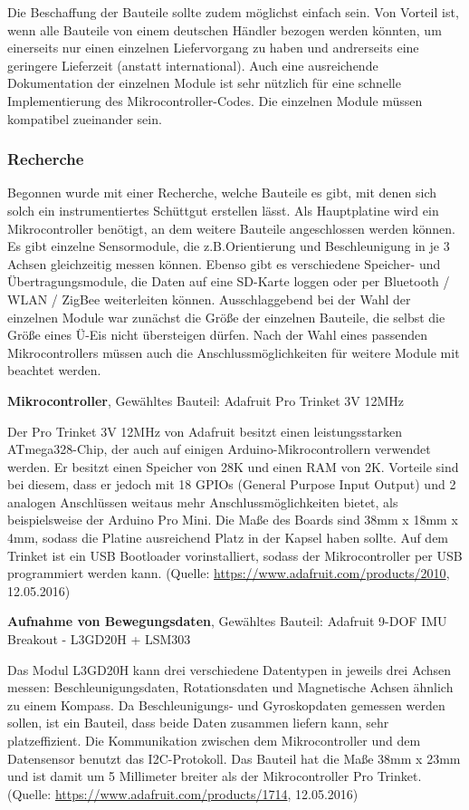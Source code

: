 Die Beschaffung der Bauteile sollte zudem möglichst einfach sein. Von Vorteil ist, wenn alle Bauteile von einem deutschen Händler bezogen werden könnten, um einerseits nur einen einzelnen Liefervorgang zu haben und andrerseits eine geringere Lieferzeit (anstatt international). Auch eine ausreichende Dokumentation der einzelnen Module ist sehr nützlich für eine schnelle Implementierung des Mikrocontroller-Codes. Die einzelnen Module müssen kompatibel zueinander sein.

\subsubsection{Recherche}
Begonnen wurde mit einer Recherche, welche Bauteile es gibt, mit denen sich solch ein instrumentiertes Schüttgut erstellen lässt. Als Hauptplatine wird ein Mikrocontroller benötigt, an dem weitere Bauteile angeschlossen werden können. Es gibt einzelne Sensormodule, die z.B.Orientierung und Beschleunigung in je 3 Achsen gleichzeitig messen können. Ebenso gibt es verschiedene Speicher- und Übertragungsmodule, die Daten auf eine SD-Karte loggen oder per Bluetooth / WLAN / ZigBee weiterleiten können. Ausschlaggebend bei der Wahl der einzelnen Module war zunächst die Größe der einzelnen Bauteile, die selbst die Größe eines Ü-Eis nicht übersteigen dürfen. Nach der Wahl eines passenden Mikrocontrollers müssen auch die Anschlussmöglichkeiten für weitere Module mit beachtet werden.

\textbf{Mikrocontroller}, Gewähltes Bauteil: Adafruit Pro Trinket 3V 12MHz

Der Pro Trinket 3V 12MHz von Adafruit besitzt einen leistungsstarken ATmega328-Chip, der auch auf einigen Arduino-Mikrocontrollern verwendet werden. Er besitzt einen Speicher von 28K und einen RAM von 2K. Vorteile sind bei diesem, dass er jedoch mit 18 GPIOs (General Purpose Input Output) und 2 analogen Anschlüssen weitaus mehr Anschlussmöglichkeiten bietet, als beispielsweise der Arduino Pro Mini. Die Maße des Boards sind  38mm x 18mm x 4mm, sodass die Platine ausreichend Platz in der Kapsel haben sollte. Auf dem Trinket ist ein USB Bootloader vorinstalliert, sodass der Mikrocontroller per USB programmiert werden kann. (Quelle: \url{https://www.adafruit.com/products/2010}, 12.05.2016)

\textbf{Aufnahme von Bewegungsdaten}, Gewähltes Bauteil: Adafruit 9-DOF IMU Breakout - L3GD20H + LSM303

Das Modul L3GD20H kann drei verschiedene Datentypen in jeweils drei Achsen messen: Beschleunigungsdaten, Rotationsdaten und Magnetische Achsen ähnlich zu einem Kompass. Da Beschleunigungs- und Gyroskopdaten gemessen werden sollen, ist ein Bauteil, dass beide Daten zusammen liefern kann, sehr platzeffizient. Die Kommunikation zwischen dem Mikrocontroller und dem Datensensor benutzt das I2C-Protokoll. Das Bauteil hat die Maße 38mm x 23mm und ist damit um 5 Millimeter breiter als der Mikrocontroller Pro Trinket. (Quelle: \url{https://www.adafruit.com/products/1714}, 12.05.2016)

